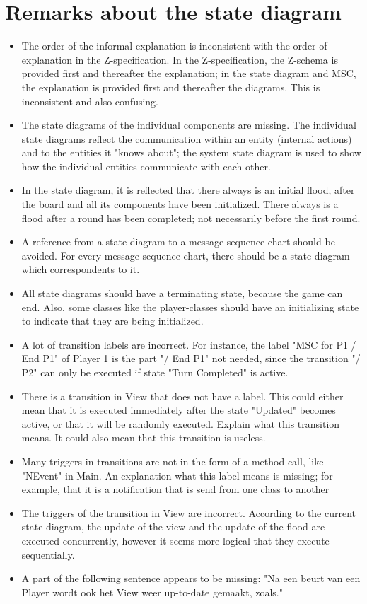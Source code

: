 \documentclass[a4paper,11pt]{article}
\begin{document}
	\section{Remarks about the state diagram}
    \begin{itemize}
        \item The order of the informal explanation is inconsistent with the order of explanation in the Z-specification. In the Z-specification, the Z-schema is provided first and thereafter the explanation; in the state diagram and MSC, the explanation is provided first and thereafter the diagrams. This is inconsistent and also confusing.
        \item The state diagrams of the individual components are missing. The individual state diagrams reflect the communication within an entity (internal actions) and to the entities it "knows about"; the system state diagram is used to show how the individual entities communicate with each other.
        \item In the state diagram, it is reflected that there always is an initial flood, after the board and all its components have been initialized. There always is a flood after a round has been completed; not necessarily before the first round.
        \item A reference from a state diagram to a message sequence chart should be avoided. For every message sequence chart, there should be a state diagram which correspondents to it.
        \item All state diagrams should have a terminating state, because the game can end. Also, some classes like the player-classes should have an initializing state to indicate that they are being initialized.
        \item A lot of transition labels are incorrect. For instance, the label "MSC for P1 / End P1" of Player 1 is the part "/ End P1" not needed, since the transition "/ P2" can only be executed if state "Turn Completed" is active.
        \item There is a transition in View that does not have a label. This could either mean that it is executed immediately after the state "Updated" becomes active, or that it will be randomly executed. Explain what this transition means. It could also mean that this transition is useless.
        \item Many triggers in transitions are not in the form of a method-call, like "NEvent" in Main. An explanation what this label means is missing; for example, that it is a notification that is send from one class to another
        \item The triggers of the transition in View are incorrect. According to the current state diagram, the update of the view and the update of the flood are executed concurrently, however it seems more logical that they execute sequentially.
        \item A part of the following sentence appears to be missing: "Na een beurt van een Player wordt ook het View weer up-to-date gemaakt, zoals."
    \end{itemize}
\end{document}
